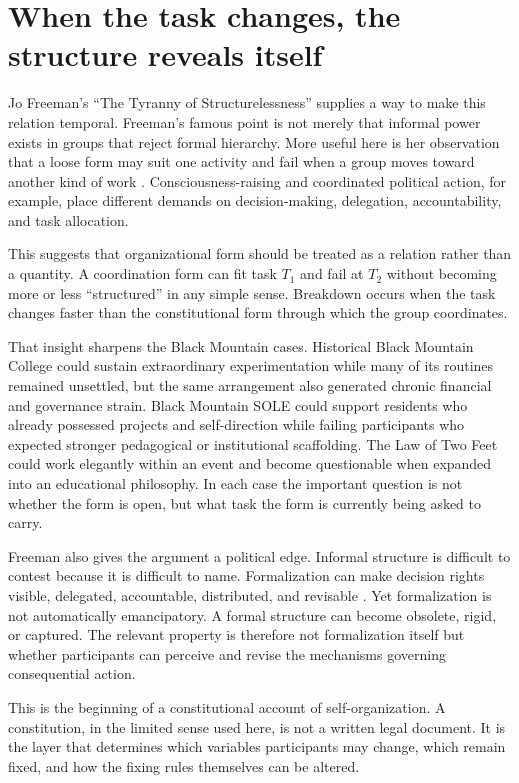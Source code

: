 \documentclass[11pt]{article}
\begin{document}
\section{When the task changes, the structure reveals itself}

Jo Freeman's ``The Tyranny of Structurelessness'' supplies a way to make this relation temporal. Freeman's famous point is not merely that informal power exists in groups that reject formal hierarchy. More useful here is her observation that a loose form may suit one activity and fail when a group moves toward another kind of work \cite{freeman1972tyranny}. Consciousness-raising and coordinated political action, for example, place different demands on decision-making, delegation, accountability, and task allocation.

This suggests that organizational form should be treated as a relation rather than a quantity. A coordination form can fit task $T_1$ and fail at $T_2$ without becoming more or less ``structured'' in any simple sense. Breakdown occurs when the task changes faster than the constitutional form through which the group coordinates.

That insight sharpens the Black Mountain cases. Historical Black Mountain College could sustain extraordinary experimentation while many of its routines remained unsettled, but the same arrangement also generated chronic financial and governance strain. Black Mountain SOLE could support residents who already possessed projects and self-direction while failing participants who expected stronger pedagogical or institutional scaffolding. The Law of Two Feet could work elegantly within an event and become questionable when expanded into an educational philosophy. In each case the important question is not whether the form is open, but what task the form is currently being asked to carry.

Freeman also gives the argument a political edge. Informal structure is difficult to contest because it is difficult to name. Formalization can make decision rights visible, delegated, accountable, distributed, and revisable \cite{freeman1972tyranny}. Yet formalization is not automatically emancipatory. A formal structure can become obsolete, rigid, or captured. The relevant property is therefore not formalization itself but whether participants can perceive and revise the mechanisms governing consequential action.

This is the beginning of a constitutional account of self-organization. A constitution, in the limited sense used here, is not a written legal document. It is the layer that determines which variables participants may change, which remain fixed, and how the fixing rules themselves can be altered.
\end{document}
